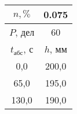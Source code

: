 \begin{tabular}[t]{|c|c|}
\hline
$n, \%$ & 0.075 \\
\hline
$P$, дел & 60 \\
\hline
$t_{абс}$, с & $h$, мм \\ 
\hline
0,0 & 200,0 \\ 
65,0 & 195,0 \\ 
130,0 & 190,0 \\ 
\hline
\end{tabular}